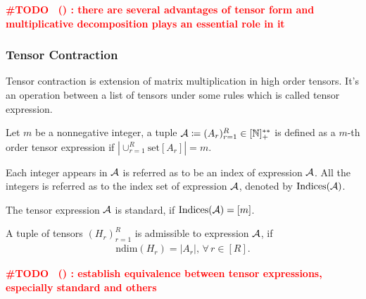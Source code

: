 \documentclass[letterpaper,11pt]{article}
\renewcommand{\todo}[2][]{%
    \textcolor{red}{%
        \textbf{ \#TODO%
        \if\relax\detokenize{#1}\relax%
        \else%
            \ (#1)%
        \fi%
        : #2}%
    }%
}
\newcommand{\takesetp}[1]{\mathrm{set}[#1]}
\newcommand{\ndim}{\mathrm{ndim}}
\newcommand{\ndimp}[1]{\ndim(#1)}
\newcommand{\indexset}{\mathrm{Indices}}
\begin{document}
\begin{bibunit}[plainnat]
\todo{there are several advantages of tensor form and multiplicative decomposition plays an essential role in it}

\subsubsection{Tensor Contraction}\label{sec:tensor_contraction}

Tensor contraction is extension of matrix multiplication in high order tensors. It's an operation between a list of tensors under some rules which is called tensor expression. 

\begin{definition}\label{def:tensor_expression}
    Let $m$ be a nonnegative integer, a tuple ${\mathcal{A}} \coloneqq (A_r)_{r=1}^R \in [\mathbb{N}]_+^{**}$ is defined as a $m$-th order tensor expression if $|\cup_{r=1}^R \takesetp{A_r}| = m$. 

    Each integer appears in ${\mathcal{A}}$ is referred as to be an index of expression ${\mathcal{A}}$. All the integers is referred as to the index set of expression ${\mathcal{A}}$, denoted by $\indexset(\calA)$.

    The tensor expression ${\mathcal{A}}$ is standard, if $\indexset(\calA) = [m]$. 
    
    A tuple of tensors $(H_r)_{r=1}^{R}$ is admissible to expression ${\mathcal{A}}$, if
    \begin{align*}
        \ndimp{H_r} = |A_r|, \, \forall \, r \in [R]. 
    \end{align*}
\end{definition}

\todo{establish equivalence between tensor expressions, especially standard and others}




\end{bibunit}
\end{document}
